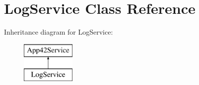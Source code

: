 \hypertarget{class_log_service}{\section{Log\+Service Class Reference}
\label{class_log_service}
}
Inheritance diagram for Log\+Service\+:\begin{figure}[H]
\begin{center}
\leavevmode
\includegraphics[height=2.000000cm]{class_log_service}
\end{center}
\end{figure}
